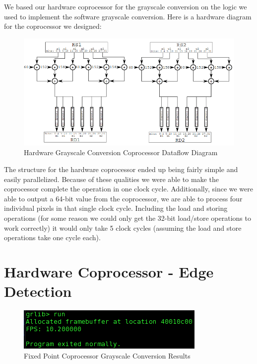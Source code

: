 \documentclass{article}
\begin{document}
We based our hardware coprocessor for the grayscale conversion on the logic we used to implement the software grayscale conversion. Here is a hardware diagram for the coprocessor we designed:

	 \begin{figure}[H]
	 	\begin{center}
	 		\includegraphics[scale=0.6]{../part5_files/Grayscale_coprocessor_dataflow.png}
	 		\caption{Hardware Grayscale Conversion Coprocessor Dataflow Diagram}
	 	\end{center}
	 \end{figure}

The structure for the hardware coprocessor ended up being fairly simple and easily parallelized. Because of these qualities we were able to make the coprocessor complete the operation in one clock cycle. Additionally, since we were able to output a 64-bit value from the coprocessor, we are able to process four individual pixels in that single clock cycle. Including the load and storing operations (for some reason we could only get the 32-bit load/store operations to work correctly) it would only take 5 clock cycles (assuming the load and store operations take one cycle each).

\section{Hardware Coprocessor - Edge Detection}

	 \begin{figure}[H]
	 	\begin{center}
	 		\includegraphics[scale=0.6]{../part5_files/Fixed_point_greyscale_coprocessor_results.png}
	 		\caption{Fixed Point Coprocessor Grayscale Conversion Results}
	 	\end{center}
	 \end{figure}
\end{document}
